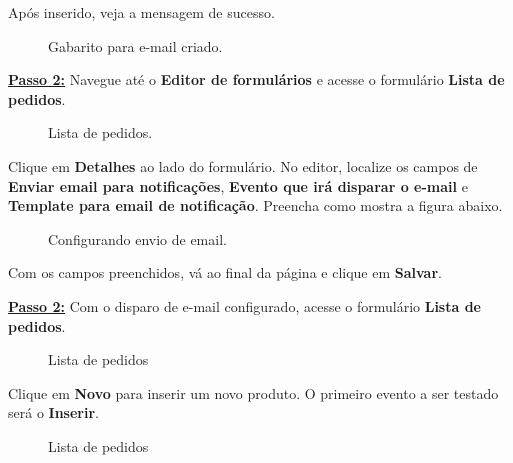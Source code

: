 \documentclass[9pt]{report}
\begin{document}
{      Após inserido, veja a mensagem de sucesso.

      \begin{figure}[H]
        \caption{Gabarito para e-mail criado.}
        \label{fig:gabaritoscriado}
      \end{figure}

      \underline{\textbf{Passo 2:}} Navegue até o \textbf{Editor de formulários} e acesse o formulário \textbf{Lista de pedidos}.

      \begin{figure}[H]
        \caption{Lista de pedidos.}
        \label{fig:listapedidosgabarito}
      \end{figure}

      Clique em \textbf{Detalhes} ao lado do formulário. No editor,
      localize os campos de \textbf{Enviar email para notificações},
      \textbf{Evento que irá disparar o e-mail} e
      \textbf{Template para email de notificação}. Preencha como
      mostra a figura abaixo.

      \begin{figure}[H]
        \caption{Configurando envio de email.}
        \label{fig:configenvioemail}
      \end{figure}

      Com os campos preenchidos, vá ao final da página e clique em
      \textbf{Salvar}.

      \underline{\textbf{Passo 2:}} Com o disparo de e-mail configurado, acesse o formulário \textbf{Lista de pedidos}.
      
      \begin{figure}[H]
        \caption{Lista de pedidos}
        \label{fig:novopedidoemail}
      \end{figure}

      Clique em \textbf{Novo} para inserir um novo produto. O
      primeiro evento a ser testado será o \textbf{Inserir}.

      \begin{figure}[H]
        \caption{Lista de pedidos}
        \label{fig:novopedidoemail}
      \end{figure}

}
\end{document}
